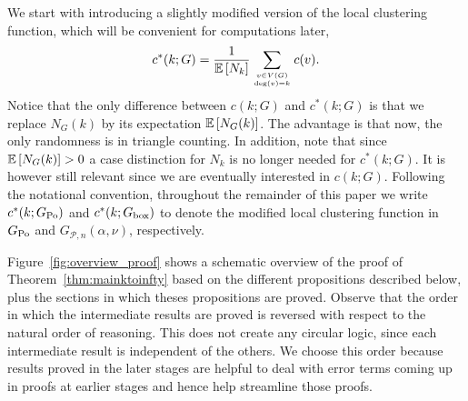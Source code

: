 We start with introducing a slightly modified version of the local clustering function, which will be convenient for computations later,
\begin{equation}\label{eq:def_local_clustering_ast_general}
	c^\ast(k;G) = \frac{1}{\mathbb{E}\left[N_k\right]} \sum_{v \in V(G) \atop \text{deg}(v)=k} c(v).
\end{equation}
Notice that the only difference between $c(k;G)$ and $c^\ast(k;G)$ is that we replace $N_G(k)$ by its expectation $\mathbb{E}\left[N_G(k)\right]$. The advantage is that now, the only randomness is in triangle counting. In addition, note that since $\mathbb{E}\left[N_G(k)\right] > 0$ a case distinction for $N_k$ is no longer needed for $c^\ast(k;G)$. It is however still relevant since we are eventually interested in $c(k;G)$. Following the notational convention, throughout the remainder of this paper we write $c^\ast(k; G_{\text{Po}})$ and $c^\ast(k; G_{\text{box}})$ to denote the modified local clustering function in $G_{\text{Po}}$ and $G_{\mathcal{P},n}(\alpha,\nu)$, respectively.

Figure~\ref{fig:overview_proof} shows a schematic overview of the proof of Theorem~\ref{thm:mainktoinfty} based on the different propositions described below, plus the sections in which theses propositions are proved. Observe that the order in which the intermediate results are proved is reversed with respect to the natural order of reasoning. This does not create any circular logic, since each intermediate result is independent of the others. We choose this order because results proved in the later stages are helpful to deal with error terms coming up in proofs at earlier stages and hence help streamline those proofs. 

